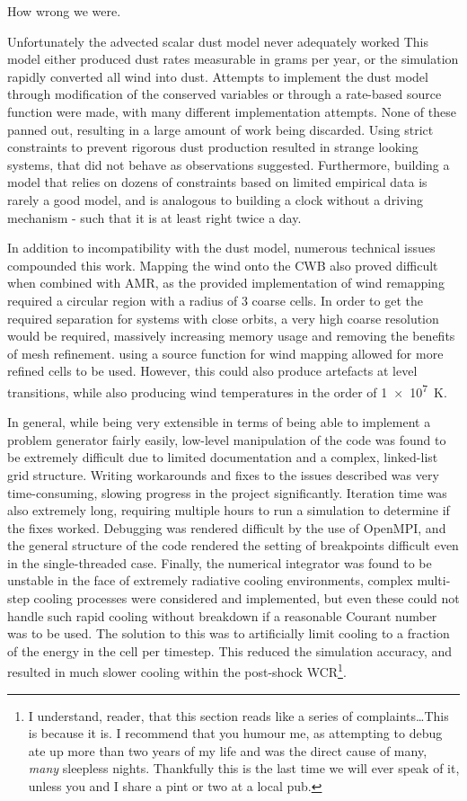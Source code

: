 How wrong we were.


Unfortunately the advected scalar dust model never adequately worked
This model either produced dust rates measurable in grams per year, or the simulation rapidly converted all wind into dust.
Attempts to implement the dust model through modification of the conserved variables or through a rate-based source function were made, with many different implementation attempts.
None of these panned out, resulting in a large amount of work being discarded.
Using strict constraints to prevent rigorous dust production resulted in strange looking systems, that did not behave as observations suggested.
Furthermore, building a model that relies on dozens of constraints based on limited empirical data is rarely a good model, and is analogous to building a clock without a driving mechanism - such that it is at least right twice a day.

In addition to incompatibility with the dust model, numerous technical issues compounded this work.
Mapping the wind onto the CWB also proved difficult when combined with AMR, as the provided implementation of wind remapping required a circular region with a radius of 3 coarse cells.
In order to get the required separation for systems with close orbits, a very high coarse resolution would be required, massively increasing memory usage and removing the benefits of mesh refinement.
using a source function for wind mapping allowed for more refined cells to be used.
However, this could also produce artefacts at level transitions, while also producing wind temperatures in the order of \SI{1e7}{K}.

In general, while being very extensible in terms of being able to implement a problem generator fairly easily, low-level manipulation of the code was found to be extremely difficult due to limited documentation and a complex, linked-list grid structure.
Writing workarounds and fixes to the issues described was very time-consuming, slowing progress in the project significantly.
Iteration time was also extremely long, requiring multiple hours to run a simulation to determine if the fixes worked.
Debugging was rendered difficult by the use of OpenMPI, and the general structure of the code rendered the setting of breakpoints difficult even in the single-threaded case.
Finally, the numerical integrator was found to be unstable in the face of extremely radiative cooling environments, complex multi-step cooling processes were considered and implemented, but even these could not handle such rapid cooling without breakdown if a reasonable Courant number was to be used.
The solution to this was to artificially limit cooling to a fraction of the energy in the cell per timestep.
This reduced the simulation accuracy, and resulted in much slower cooling within the post-shock WCR\footnote{I understand, reader, that this section reads like a series of complaints\ldots This is because it is. I recommend that you humour me, as attempting to debug \mg{} ate up more than two years of my life and was the direct cause of many, \textit{many} sleepless nights. Thankfully this is the last time we will ever speak of it, unless you and I share a pint or two at a local pub.}.

